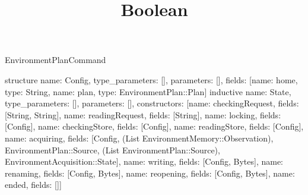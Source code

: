 \begin{lexlean}{EnvironmentPlanCommand}
\title{Boolean}
\begin{semanticmodule}
structure{
 name: Config, type_parameters: [], parameters: [],
 fields: [{name: home, type: String}, {name: plan, type: EnvironmentPlan::Plan}]
}
inductive{
 name: State, type_parameters: [], parameters: [],
 constructors: [{name: checkingRequest, fields: [String, String]}, {name: readingRequest, fields: [String]}, {name: locking, fields: [Config]}, {name: checkingStore, fields: [Config]}, {name: readingStore, fields: [Config]}, {name: acquiring, fields: [Config, (List EnvironmentMemory::Observation), EnvironmentPlan::Source, (List EnvironmentPlan::Source), EnvironmentAcquisition::State]}, {name: writing, fields: [Config, Bytes]}, {name: renaming, fields: [Config, Bytes]}, {name: reopening, fields: [Config, Bytes]}, {name: ended, fields: []}]
}


\end{semanticmodule}
\end{lexlean}
